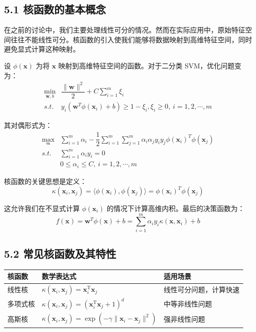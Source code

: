 \documentclass[12pt,a4paper]{ctexart}
\renewcommand{\arraystretch}{1.5}
\begin{document}
	\subsection*{5.1 核函数的基本概念}
	
	在之前的讨论中，我们主要处理线性可分的情况。然而在实际应用中，原始特征空间往往不能线性可分。核函数的引入使我们能够将数据映射到高维特征空间，同时避免显式计算这种映射。
	
	设 $\phi(\bm{x})$ 为将 $\bm{x}$ 映射到高维特征空间的函数。对于二分类 SVM，优化问题变为：
	\[
	\begin{array}{ll}
		\min\limits_{\bm{w},b} & \dfrac{\|\bm{w}\|^2}{2} + C\sum_{i=1}^m\xi_i\\[12pt]
		s.t. & y_i(\bm{w}^T\phi(\bm{x}_i)+b)\geqslant 1-\xi_i, \xi_i \geq 0, \ i=1,2,\cdots,m
	\end{array}
	\]
	
	其对偶形式为：
	\[
	\begin{array}{ll}
		\max\limits_{\bm{\alpha}} & \sum\limits_{i=1}^m \alpha_i-\dfrac{1}{2}\sum\limits_{i=1}^m\sum\limits_{j=1}^m\alpha_i\alpha_j y_i y_j\phi(\bm{x}_i)^T\phi(\bm{x}_j)\\
		s.t. & \sum\limits_{i=1}^m\alpha_iy_i=0\\
		& 0 \leq \alpha_i \leq C, \ i=1,2,\cdots,m
	\end{array}
	\]
	
	核函数的关键思想是定义：
	\[
	\kappa(\bm{x}_i,\bm{x}_j)=\langle\phi(\bm{x}_i),\phi(\bm{x}_j)\rangle=\phi(\bm{x}_i)^T\phi(\bm{x}_j)
	\]
	
	这允许我们在不显式计算 $\phi(\bm{x}_i)$ 的情况下计算高维内积。最后的决策函数为：
	\[
	f(\bm{x})=\bm{w}^T\phi(\bm{x})+b=\sum\limits_{i=1}^m\alpha_iy_i\kappa(\bm{x},\bm{x}_i)+b
	\]
	
	\subsection*{5.2 常见核函数及其特性}
	
	\begin{table}[H]
		\centering
		\renewcommand{\arraystretch}{2.0}
		\begin{tabular}{|l|l|l|}
			\hline
			\textbf{核函数} & \textbf{数学表达式} & \textbf{适用场景} \\
			\hline
			线性核 & $\kappa(\bm{x}_i,\bm{x}_j)=\bm{x}_i^{\mathrm{T}}\bm{x}_j$ & 线性可分问题，计算快速 \\
			\hline
			多项式核 & $\kappa(\bm{x}_i,\bm{x}_j)=(\bm{x}_i^{\mathrm{T}}\bm{x}_j+1)^d$ & 中等非线性问题 \\
			\hline
			高斯核 & $\kappa(\bm{x}_i,\bm{x}_j)=\exp(-\gamma\|\bm{x}_i-\bm{x}_j\|^2)$ & 强非线性问题 \\
			\hline
		\end{tabular}
	\end{table}
	
\end{document}
